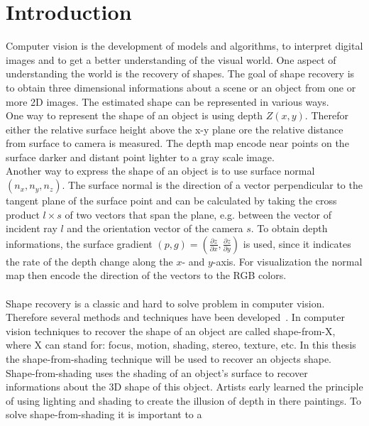 \chapter{Introduction}
	Computer vision is the development of models and algorithms, to interpret digital images and to get a better understanding of the visual world. One aspect of understanding the world is the recovery of shapes. The goal of shape recovery is to obtain three dimensional informations about a scene or an object from one or more 2D images. The estimated shape can be represented in various ways. 
	\\
	One way to represent the shape of an object is using depth $Z(x,y)$. Therefor either the relative surface height above the x-y plane ore the relative distance from surface to camera is measured. The depth map encode near points on the surface darker and distant point lighter to a gray scale image. 
	\\
	Another way to express the shape of an object is to use surface normal $(n_x, n_y, n_z)$. The surface normal is the direction of a vector perpendicular to the tangent plane of the surface point and can be calculated by taking the cross product $l \times s$ of two vectors that span the plane, e.g. between the vector of incident ray $l$ and the orientation vector of the camera $s$. To obtain depth informations, the surface gradient $(p,g) = (\frac{\partial z}{\partial x}, \frac{\partial z}{\partial y}) $ is used, since it indicates the rate of the depth change along the $x$- and $y$-axis. For visualization the normal map then encode the direction of the vectors to the RGB colors.
	\\ 
	\\
	Shape recovery is a classic and hard to solve problem in computer vision. Therefore several methods and techniques have been developed~\cite{Horn_SHAPE_FROM_SHADING_1970, Shape_from_X_psychophysics_and_computation}. In computer vision techniques to recover the shape of an object are called shape-from-X, where X can stand for: focus, motion, shading, stereo, texture, etc. In this thesis the shape-from-shading technique will be used to recover an objects shape. Shape-from-shading uses the shading of an object's surface to recover informations about the 3D shape of this object. Artists early learned the principle of using lighting and shading to create the illusion of depth in there paintings. To solve shape-from-shading it is important to a
